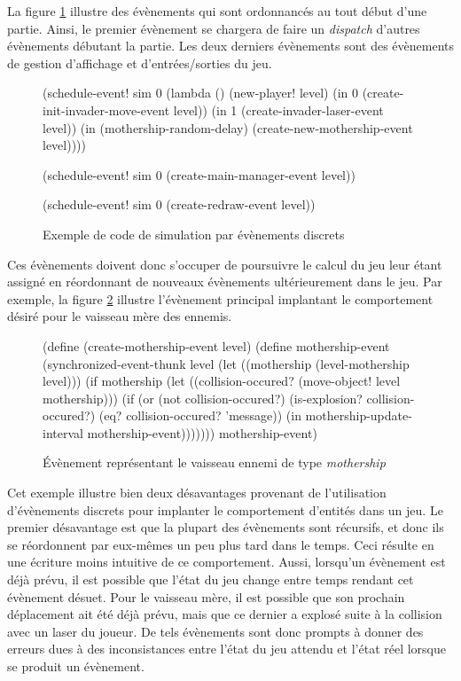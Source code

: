 \documentclass[12pt,twoside,letterpaper,francais]{book}
\begin{document}
La figure \ref{Exp:des} illustre des évènements qui sont ordonnancés
au tout début d'une partie. Ainsi, le premier évènement se chargera de
faire un \textit{dispatch} d'autres évènements débutant la partie. Les
deux derniers évènements sont des évènements de gestion d'affichage et
d'entrées/sorties du jeu.\\

\begin{figure}[htb!]
  \begin{schemecode}
(schedule-event! sim 0
  (lambda () (new-player! level)
             (in 0 (create-init-invader-move-event level))
             (in 1 (create-invader-laser-event level))
             (in (mothership-random-delay)
                 (create-new-mothership-event level))))
 
(schedule-event! sim 0 (create-main-manager-event level))

(schedule-event! sim 0 (create-redraw-event level))
  \end{schemecode}
  \caption{Exemple de code de simulation par évènements discrets}
  \label{Exp:des}
\end{figure}

Ces évènements doivent donc s'occuper de poursuivre le calcul du jeu
leur étant assigné en réordonnant de nouveaux évènements
ultérieurement dans le jeu. Par exemple, la figure \ref{Exp:mother-ev}
illustre l'évènement principal implantant le comportement désiré pour
le vaisseau mère des ennemis.\\

\begin{figure}[htb!]
  \begin{schemecode}
(define (create-mothership-event level)
 (define mothership-event
   (synchronized-event-thunk level
     (let ((mothership (level-mothership level)))
       (if mothership
           (let ((collision-occured? (move-object! level mothership)))
             (if (or (not collision-occured?)
                     (is-explosion? collision-occured?)
                     (eq? collision-occured? 'message))
                 (in mothership-update-interval mothership-event)))))))
  mothership-event)
  \end{schemecode}
  \caption{Évènement représentant le vaisseau ennemi de type
    \textit{mothership}}
  \label{Exp:mother-ev}
\end{figure}

Cet exemple illustre bien deux désavantages provenant de l'utilisation
d'évènements discrets pour implanter le comportement d'entités dans un
jeu. Le premier désavantage est que la plupart des évènements sont
récursifs, et donc ils se réordonnent par eux-mêmes un peu plus tard
dans le temps. Ceci résulte en une écriture moins intuitive de ce
comportement. Aussi, lorsqu'un évènement est déjà prévu, il est
possible que l'état du jeu change entre temps rendant cet évènement
désuet. Pour le vaisseau mère, il est possible que son prochain
déplacement ait été déjà prévu, mais que ce dernier a explosé suite à
la collision avec un laser du joueur. De tels évènements sont donc
prompts à donner des erreurs dues à des inconsistances entre l'état du
jeu attendu et l'état réel lorsque se produit un évènement.
\end{document}

